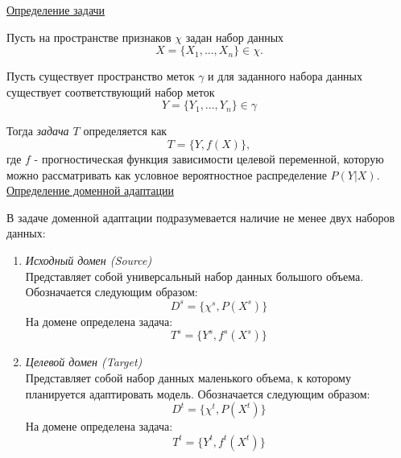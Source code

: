 \underline{Определение задачи}

Пусть на пространстве признаков $\chi$ задан набор данных
\begin{equation}
	X = \{X_1, ..., X_n\} \in \chi.
\end{equation}

Пусть существует пространство меток $\gamma$ и для заданного набора данных существует соответствующий набор меток
\begin{equation}
Y = \{Y_1, ..., Y_n\} \in \gamma
\end{equation}

Тогда \textit{задача $T$} определяется как 
\begin{equation}
T = \{Y, f(X)\},
\end{equation}
где $f$ - прогностическая функция зависимости целевой переменной, которую можно рассматривать как условное вероятностное распределение $P(Y|X)$.\\

\underline{Определение доменной адаптации}

В задаче доменной адаптации подразумевается наличие не менее двух наборов данных:
\begin{enumerate}
\item \textit{Исходный домен (Source)}\\
Представляет собой универсальный набор данных большого объема. Обозначается следующим образом:
$$D^s = \{\chi^s, P(X^s)\}$$
На домене определена задача: $$T^s = \{Y^s, f^s(X^s)\}$$
\item \textit{Целевой домен (Target)}\\
Представляет собой набор данных маленького объема, к которому планируется адаптировать модель. Обозначается следующим образом:
$$D^t = \{\chi^t, P(X^t)\}$$
На домене определена задача: $$T^t = \{Y^t, f^t(X^t)\}$$
\end{enumerate}

